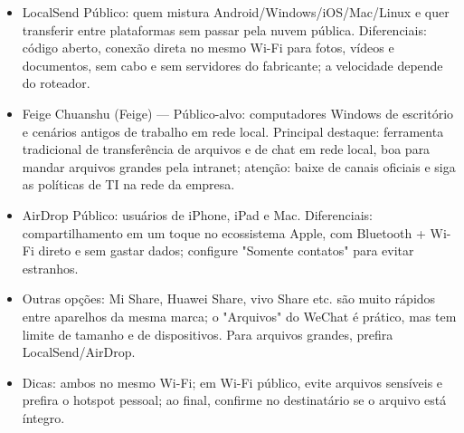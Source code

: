 
\begin{itemize}
  \item LocalSend Público: quem mistura Android/Windows/iOS/Mac/Linux e quer transferir entre plataformas sem passar pela nuvem pública. Diferenciais: código aberto, conexão direta no mesmo Wi-Fi para fotos, vídeos e documentos, sem cabo e sem servidores do fabricante; a velocidade depende do roteador.
  \item Feige Chuanshu (Feige) — Público-alvo: computadores Windows de escritório e cenários antigos de trabalho em rede local. Principal destaque: ferramenta tradicional de transferência de arquivos e de chat em rede local, boa para mandar arquivos grandes pela intranet; atenção: baixe de canais oficiais e siga as políticas de TI na rede da empresa.
  \item AirDrop Público: usuários de iPhone, iPad e Mac. Diferenciais: compartilhamento em um toque no ecossistema Apple, com Bluetooth + Wi-Fi direto e sem gastar dados; configure "Somente contatos" para evitar estranhos.
  \item Outras opções: Mi Share, Huawei Share, vivo Share etc. são muito rápidos entre aparelhos da mesma marca; o "Arquivos" do WeChat é prático, mas tem limite de tamanho e de dispositivos. Para arquivos grandes, prefira LocalSend/AirDrop.
  \item Dicas: ambos no mesmo Wi-Fi; em Wi-Fi público, evite arquivos sensíveis e prefira o hotspot pessoal; ao final, confirme no destinatário se o arquivo está íntegro.
\end{itemize}


